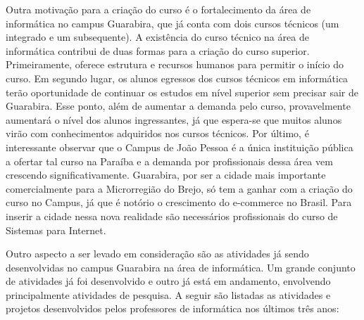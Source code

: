 Outra motiva\c{c}\~ao para a criação do curso é o fortalecimento da área de informática no campus Guarabira, que já conta com dois cursos técnicos (um integrado e um subsequente). A existência do curso técnico na área de informática contribui de duas formas para a criação do curso superior. Primeiramente, oferece estrutura e recursos humanos para permitir o início do curso. Em segundo lugar, os alunos egressos dos cursos técnicos em informática terão oportunidade de continuar os estudos em nível superior sem precisar sair de Guarabira. Esse ponto, além de aumentar a demanda pelo curso, provavelmente aumentará o nível dos alunos ingressantes, já que espera-se que muitos alunos virão com conhecimentos adquiridos nos cursos técnicos. Por último, é interessante observar que o Campus de João Pessoa é a única instituição pública a ofertar tal curso na Paraíba e a demanda por profissionais dessa área vem crescendo significativamente. Guarabira, por ser a cidade mais importante comercialmente para a Microrregião do Brejo, só tem a ganhar com a criação do curso no Campus, já que é notório o crescimento do e-commerce no Brasil. Para inserir a cidade nessa nova realidade são necessários profissionais do curso de Sistemas para Internet. %

	Outro aspecto a ser levado em consideração são as atividades já sendo desenvolvidas no campus Guarabira na área de informática. Um grande conjunto de atividades já foi desenvolvido e outro já está em andamento, envolvendo principalmente atividades de pesquisa. A seguir são listadas as atividades e projetos desenvolvidos pelos professores de informática nos últimos tr\^es anos:

